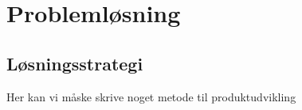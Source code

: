 \part{Problemløsning}

\chapter{Løsningsstrategi}

Her kan vi måske skrive noget metode til produktudvikling